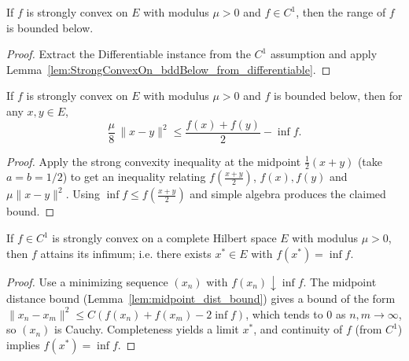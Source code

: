 \begin{lemma}\label{lem:StrongConvexOn_bddBelow_range}
  \leanok{}
  If $f$ is strongly convex on $E$ with modulus $\mu>0$ and $f\in C^1$, then the range of $f$ is bounded below.
\end{lemma}

\begin{proof}
  \leanok{}
  Extract the Differentiable instance from the $C^1$ assumption and apply
  Lemma~\ref{lem:StrongConvexOn_bddBelow_from_differentiable}.
\end{proof}

\begin{lemma}\label{lem:midpoint_dist_bound}
  \leanok{}
  \uses{}
  If $f$ is strongly convex on $E$ with modulus $\mu>0$ and $f$ is bounded below, then for any $x,y\in E$,
  \[
    \frac{\mu}{8}\,\|x-y\|^2 \le \frac{f(x)+f(y)}{2} - \inf f.
  \]
\end{lemma}
\begin{proof}
  \leanok{}
  Apply the strong convexity inequality at the midpoint $\tfrac12(x+y)$ (take $a=b=1/2$) to get an inequality
  relating $f(\frac{x+y}{2})$, $f(x),f(y)$ and $\mu\|x-y\|^2$. Using $\inf f\le f(\frac{x+y}{2})$ and simple
  algebra produces the claimed bound.
\end{proof}

\begin{theorem}\label{thm:exists_minimizer_strong_convex}
  \leanok{}
  If $f\in C^1$ is strongly convex on a complete Hilbert space $E$ with modulus $\mu>0$, then $f$ attains its infimum;
  i.e. there exists $x^*\in E$ with $f(x^*)=\inf f$.
\end{theorem}
\begin{proof}
  \leanok{}
  Use a minimizing sequence $(x_n)$ with $f(x_n)\downarrow\inf f$. The midpoint distance bound
  (Lemma~\ref{lem:midpoint_dist_bound}) gives a bound of the form $\|x_n-x_m\|^2\le C( f(x_n)+f(x_m) - 2\inf f)$,
  which tends to $0$ as $n,m\to\infty$, so $(x_n)$ is Cauchy. Completeness yields a limit $x^*$, and continuity of $f$
  (from $C^1$) implies $f(x^*)=\inf f$.
\end{proof}

